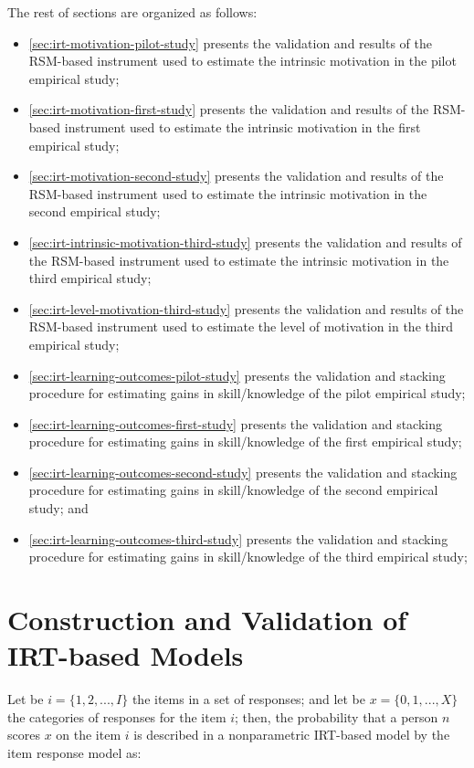 The rest of sections are organized as follows:
\begin{itemize}
\item
\autoref{sec:irt-motivation-pilot-study} presents the validation and results of the RSM-based instrument used to estimate the intrinsic motivation in the pilot empirical study;
\item
\autoref{sec:irt-motivation-first-study} presents the validation and results of the RSM-based instrument used to estimate the intrinsic motivation in the first empirical study;
\item
\autoref{sec:irt-motivation-second-study} presents the validation and results of the RSM-based instrument used to estimate the intrinsic motivation in the second empirical study;
\item
\autoref{sec:irt-intrinsic-motivation-third-study} presents the validation and results of the RSM-based instrument used to estimate the intrinsic motivation in the third empirical study;
\item
\autoref{sec:irt-level-motivation-third-study} presents the validation and results of the RSM-based instrument used to estimate the level of motivation in the third empirical study;
\item
\autoref{sec:irt-learning-outcomes-pilot-study} presents the validation and stacking procedure for estimating gains in skill/knowledge of the pilot empirical study;
\item
\autoref{sec:irt-learning-outcomes-first-study} presents the validation and stacking procedure for estimating gains in skill/knowledge of the first empirical study;
\item
\autoref{sec:irt-learning-outcomes-second-study} presents the validation and stacking procedure for estimating gains in skill/knowledge of the second empirical study; and
\item
\autoref{sec:irt-learning-outcomes-third-study} presents the validation and stacking procedure for estimating gains in skill/knowledge of the third empirical study;
\end{itemize}


\section{Construction and Validation of IRT-based Models}
\label{sec:irt-motivation}

Let be $i = \{1,2, ..., I\}$ the items in a set of responses; and let be $x = \{0,1, ..., X\}$ the categories of responses for the item $i$; then, the probability that a person $n$ scores $x$ on the item $i$ is described in a nonparametric IRT-based model by the item response model \cite{AdamsWu2007, AdamsWilsonWu1997} as:

